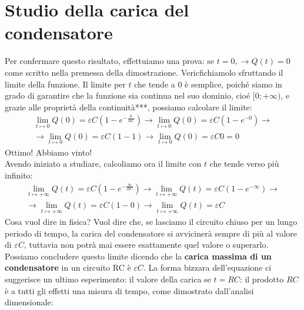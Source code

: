 \documentclass[a3paper, twoside, openany]{book}
\theoremstyle{definition}
\begin{document}
\section{Studio della carica del condensatore}
Per confermare questo risultato, effettuiamo una prova: se $t=0,\longrightarrow Q(t)=0$ come scritto nella premessa della dimostrazione. Vericfichiamolo sfruttando il limite della funzione. Il limite per $t$ che tende a 0 è semplice, poiché siamo in grado di garantire che la funzione sia continua nel suo dominio, cioé $[0;+\infty)$, e grazie alle proprietà della continuità***, possiamo calcolare il limite: \begin{multline*}\lim_{t\mapsto 0}Q(0)=\varepsilon C \left(1-e^{-\frac{0}{RC}}\right)\longrightarrow \lim_{t\mapsto 0}Q(0)=\varepsilon C \left(1-e^{-0}\right)\longrightarrow \\\longrightarrow \lim_{t\mapsto 0}Q(0)=\varepsilon C (1-1)\longrightarrow \lim_{t\mapsto 0}Q(0)=\varepsilon C 0=0\end{multline*} Ottimo! Abbiamo vinto! \\ Avendo iniziato a studiare, calcoliamo ora il limite con $t$ che tende verso più infinito: \begin{multline*}\lim_{t\mapsto +\infty}Q(t)=\varepsilon C \left(1-e^{-\frac{\infty}{RC}}\right)\longrightarrow \lim_{t\mapsto +\infty}Q(t)=\varepsilon C \left(1-e^{-\infty}\right)\longrightarrow \\\longrightarrow \lim_{t\mapsto +\infty}Q(t)=\varepsilon C (1-0)\longrightarrow\lim_{t\mapsto +\infty} Q(t)=\varepsilon C\end{multline*} Cosa vuol dire in fisica? Vuol dire che, se lasciamo il circuito chiuso per un lungo periodo di tempo, la carica del condensatore si avvicinerà sempre di più al valore di $\varepsilon C$, tuttavia non potrà mai essere esattamente quel valore o superarlo. Possiamo concludere questo limite dicendo che la \textbf{carica massima di un condensatore} in un circuito RC è $\varepsilon C$. La forma bizzara dell'equazione ci suggerisce un ultimo esperimento: il valore della carica se $t=RC$: il prodotto $RC$ è a tutti gli effetti una misura di tempo, come dimostrato dall'analisi dimensionale:
\end{document}
